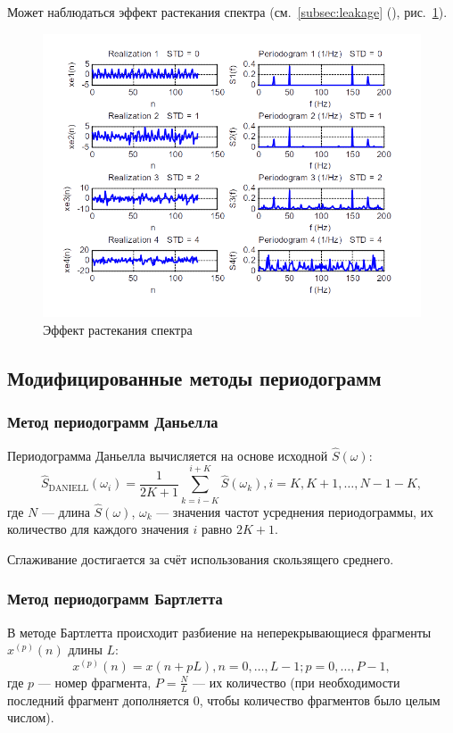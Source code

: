 \documentclass[a4paper, 14pt]{extarticle}
\begin{document}
Может наблюдаться эффект растекания спектра (см.~\ref{subsec:leakage} (), рис.~\ref{img:leakage}).
\begin{figure}[h]
    \centering
    \includegraphics[width=\textwidth]{img/leakage.png}
    \caption{Эффект растекания спектра}%
    \label{img:leakage}
\end{figure}

\subsection{Модифицированные методы периодограмм}
\subsubsection{Метод периодограмм Даньелла}
Периодограмма Даньелла вычисляется на основе исходной $\hat{S}(\omega)$:
\begin{equation}
    \hat{S}_\text{DANIELL}(\omega_i) = \frac{1}{2K+1} \sum^{i+K}_{k=i-K} \hat{S}(\omega_k), i = K, K + 1, \ldots, N - 1 - K,
\end{equation}
где $N$ --- длина $\hat{S}(\omega)$, $\omega_k$ --- значения частот усреднения периодограммы, их количество для каждого значения $i$ равно $2K+1$.

Сглаживание достигается за счёт использования скользящего среднего.

\subsubsection{Метод периодограмм Бартлетта}
В методе Бартлетта происходит разбиение на неперекрывающиеся фрагменты $x^{(p)}(n) $ длины $L$:
\begin{equation}
    x^{(p)}(n) = x(n + pL), n = 0, \ldots, L - 1; p = 0, \ldots, P - 1,
\end{equation}
где $p$ --- номер фрагмента, $P = \frac{N}{L} $ --- их количество (при необходимости последний фрагмент дополняется 0, чтобы количество фрагментов было целым числом).
\end{document}
